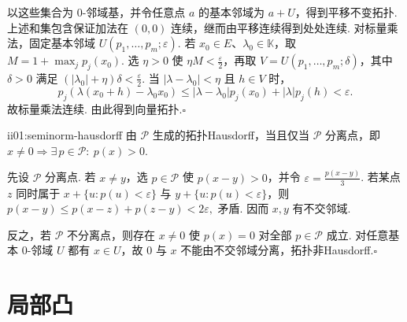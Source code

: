 \begin{FAProof}
以这些集合为 \(\displaystyle0\)-邻域基，并令任意点 \(\displaystyle a\) 的基本邻域为 \(\displaystyle a+U\)，得到平移不变拓扑. 上述和集包含保证加法在 \(\displaystyle(0,0)\) 连续，继而由平移连续得到处处连续. 对标量乘法，固定基本邻域 \(\displaystyle U(p_1,\dots,p_m;\varepsilon)\). 若 \(\displaystyle x_0\in E\)、\(\displaystyle \lambda_0\in\mathbb K\)，取 \(\displaystyle M=1+\max_jp_j(x_0)\). 选 \(\displaystyle \eta>0\) 使 \(\displaystyle \eta M<\frac{\varepsilon}{2}\)，再取 \(\displaystyle V=U(p_1,\dots,p_m;\delta)\)，其中 \(\displaystyle \delta>0\) 满足 \(\displaystyle (|\lambda_0|+\eta)\delta<\frac{\varepsilon}{2}\). 当 \(\displaystyle |\lambda-\lambda_0|<\eta\) 且 \(\displaystyle h\in V\) 时，
\[
p_j(\lambda(x_0+h)-\lambda_0x_0)
\leqslant
|\lambda-\lambda_0|p_j(x_0)+|\lambda|p_j(h)
<\varepsilon.
\]
故标量乘法连续. 由此得到向量拓扑.\hfill\(\square\)
\end{FAProof}

\begin{FAProposition}[B][半范数拓扑的Hausdorff判据]{ii01:seminorm-hausdorff}
由 \(\displaystyle \mathcal P\) 生成的拓扑Hausdorff，当且仅当 \(\displaystyle \mathcal P\) 分离点，即
\(\displaystyle x\neq0 \Longrightarrow \exists\,p\in\mathcal P:\ p(x)>0.\)
\end{FAProposition}

\begin{FAProof}
先设 \(\displaystyle \mathcal P\) 分离点. 若 \(\displaystyle x\neq y\)，选 \(\displaystyle p\in\mathcal P\) 使 \(\displaystyle p(x-y)>0\)，并令 \(\displaystyle \varepsilon=\frac{p(x-y)}{3}\). 若某点 \(\displaystyle z\) 同时属于 \(\displaystyle x+\{u:p(u)<\varepsilon\}\) 与 \(\displaystyle y+\{u:p(u)<\varepsilon\}\)，则
\(\displaystyle p(x-y) \leqslant p(x-z)+p(z-y) <2\varepsilon,\)
矛盾. 因而 \(\displaystyle x,y\) 有不交邻域.

反之，若 \(\displaystyle \mathcal P\) 不分离点，则存在 \(\displaystyle x\neq0\) 使 \(\displaystyle p(x)=0\) 对全部 \(\displaystyle p\in\mathcal P\) 成立. 对任意基本 \(\displaystyle0\)-邻域 \(\displaystyle U\) 都有 \(\displaystyle x\in U\)，故 \(\displaystyle0\) 与 \(\displaystyle x\) 不能由不交邻域分离，拓扑非Hausdorff.\hfill\(\square\)
\end{FAProof}

\section{局部凸}\label{sec:ii01-locally-convex}

